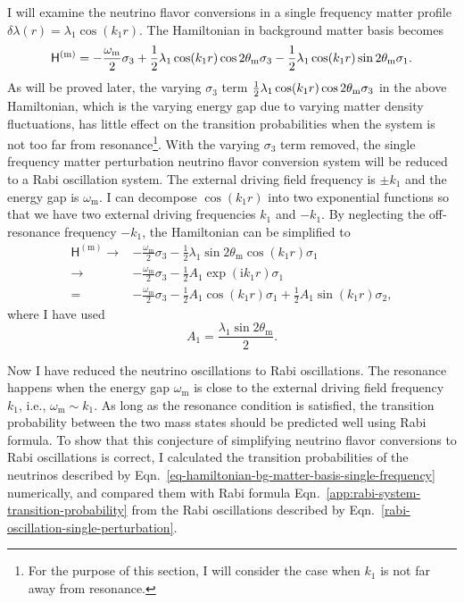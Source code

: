 I will examine the neutrino flavor conversions in a single frequency matter profile $\delta\lambda(r) = \lambda_1 \cos(k_1 r)$. The Hamiltonian in background matter basis becomes
\begin{equation}
\mathsf H^{(\mm)} = - \frac{\omega_\mm}{2}\sigma_3  + \frac{1}{2} \lambda_1 \cos(k_1 r) \cos 2\theta_\mm \sigma_3 - \frac{1}{2} \lambda_1 \cos(k_1 r)\sin 2\theta_\mm \sigma_1.
\label{eq-hamiltonian-bg-matter-basis-single-frequency}
\end{equation}
As will be proved later, the varying $\sigma_3$ term $\frac{1}{2} \lambda_1 \cos(k_1 r) \cos 2\theta_\mathrm m \sigma_3$ in the above Hamiltonian, which is the varying energy gap due to varying matter density fluctuations, has little effect on the transition probabilities when the system is not too far from resonance\footnote{For the purpose of this section, I will consider the case when $k_1$ is not far away from resonance.}. With the varying $\sigma_3$ term removed, the single frequency matter perturbation neutrino flavor conversion system will be reduced to a Rabi oscillation system. The external driving field frequency is $\pm k_1$ and the energy gap is $\omega_{\mathrm m}$. I can decompose $\cos( k_1 r )$ into two exponential functions so that we have two external driving frequencies $k_1$ and $-k_1$. By neglecting the off-resonance frequency $-k_1$, the Hamiltonian can be simplified to
\begin{align}
\mathsf H^{(\mathrm{m})} \to & -\frac{\omega_{\mathrm m}}{2} \sigma_3  - \frac{1}{2} \lambda_1 \sin 2\theta_{\mathrm m} \cos( k_1 r ) \sigma_1\label{eq-hamiltonian-bg-matter-basis-single-frequency} \\
\to & -\frac{\omega_{\mathrm m}}{2} \sigma_3  - \frac{1}{2} A_1 \exp (\mathrm ik_1 r) \sigma_1 \nonumber \\
= & -\frac{\omega_{\mathrm m}}{2} \sigma_3  - \frac{1}{2} A_1 \cos ( k_1 r)  \sigma_1 + \frac{1}{2} A_1\sin(k_1 r) \sigma_2,\nonumber
\end{align}
where I have used
\begin{equation}
A_1 = \frac{\lambda_1 \sin 2\theta_{\mathrm m} }{2}.
\label{eq-define-a1}
\end{equation}



Now I have reduced the neutrino oscillations to Rabi oscillations. The resonance happens when the energy gap $\omega_{\mathrm m}$ is close to the external driving field frequency $k_1$, i.e., $\omega_{\mathrm m} \sim k_1$. As long as the resonance condition is satisfied, the transition probability between the two mass states should be predicted well using Rabi formula.
To show that this conjecture of simplifying neutrino flavor conversions to Rabi oscillations is correct, I calculated the transition probabilities of the neutrinos described by Eqn.~\ref{eq-hamiltonian-bg-matter-basis-single-frequency} numerically, and compared them with Rabi formula Eqn.~\ref{app:rabi-system-transition-probability} from the Rabi oscillations described by Eqn.~\ref{rabi-oscillation-single-perturbation}.

